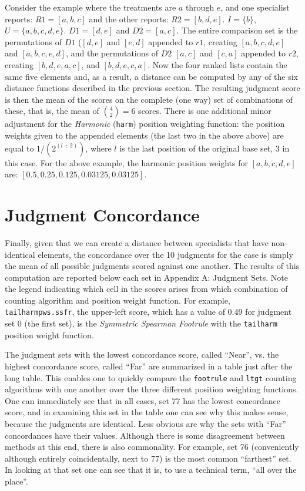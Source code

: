 \documentclass{article}
\begin{document}
Consider the example where the treatments are $a$ through $e$, and one specialist reports: $R1=[a,b,c]$ and the other reports: $R2=[b,d,e]$. $I=\{b\}$, $U=\{a,b,c,d,e\}$. $D1=[d,e]$ and $D2=[a,c]$. The entire comparison set is the permutations of $D1$ ($[d, e]$ and $[e, d]$ appended to $r1$, creating $[a,b,c,d,e]$ and $[a,b,c,e,d]$, and the permutations of $D2$ $[a, c]$ and $[c, a]$ appended to $r2$, creating  $[b,d,e,a,c]$, and $[b,d,e,c,a]$. Now the four ranked lists contain the same five elements and, as a result, a distance can be computed by any of the six distance functions described in the previous section. The resulting judgment score is then the mean of the scores on the complete (one way) set of combinations of these, that is, the mean of ${4 \choose 2}=6$ scores. There is one additional minor adjustment for the \emph{Harmonic} (\texttt{harm}) position weighting function: the position weights given to the appended elements (the last two in the above above) are equal to $1/(2^{(l+2)})$, where $l$ is the last position of the original base set, 3 in this case. For the above example, the harmonic position weights for $[a,b,c,d,e]$ are: $[0.5, 0.25,0.125,0.03125,0.03125]$.    

\newpage
\section{Judgment Concordance} 

Finally, given that we can create a distance between specialists that have non-identical elements, the concordance over the 10 judgments for the case is simply the mean of all possible judgments scored against one another. The results of this computation are reported below each set in Appendix A: Judgment Sets. Note the legend indicating which cell in the scores arises from which combination of counting algorithm and position weight function. For example, \texttt{tailharmpws.ssfr}, the upper-left score, which has a value of 0.49 for judgment set 0 (the first set), is the \emph{Symmetric Spearman Footrule} with the \texttt{tailharm} position weight function.

The judgment sets with the lowest concordance score, called ``Near'', vs. the highest concordance score, called ``Far'' are summarized in a table just after the long table. This enables one to quickly compare the \texttt{footrule} and \texttt{ltgt} counting algorithms with one another over the three different position weighting functions. One can immediately see that in all cases, set 77 has the lowest concordance score, and in examining this set in the table one can see why this makes sense, because the judgments are identical. Less obvious are why the sets with ``Far'' concordances have their values. Although there is some disagreement between methods at this end, there is also commonality. For example, set 76 (conveniently although entirely coincidentally, next to 77) is the most common ``farthest'' set. In looking at that set one can see that it is, to use a technical term, ``all over the place''. 
\end{document}
